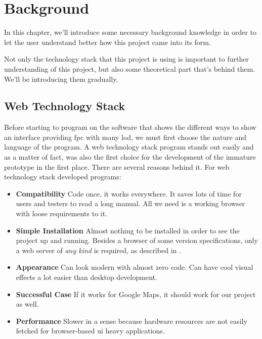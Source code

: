 
\chapter{Background} %

\label{Chapter2} %

In this chapter, we'll introduce some necessary background knowledge in order to let the user understand better how this project came into its form.

Not only the technology stack that this project is using is important to further understanding of this project, but also some theoretical part that's behind them. We'll be introducing them gradually.


\section{Web Technology Stack}

Before starting to program on the software that shows the different ways to show an interface providing \gls{fpc} with many \gls{lod}, we must first choose the nature and language of the program. A web technology stack program stands out easily and as a matter of fact, was also the first choice for the development of the immature prototype in the first place. There are several reasons behind it. For web technology stack developed programs:

\begin{itemize}
    \item \textbf{Compatibility} Code once, it works everywhere. It saves lots of time for users and testers to read a long manual. All we need is a working browser with loose requirements to it.
    \item \textbf{Simple Installation} Almost nothing to be installed in order to see the project up and running. Besides a browser of some version specifications, only a web server of \emph{any kind} is required, as described in .
    \item \textbf{Appearance} Can look modern with almost zero code. Can have cool visual effects a lot easier than desktop development. 
    \item \textbf{Successful Case} If it works for Google Maps, it should work for our project as well.
    \item \textbf{Performance} Slower in a sense because hardware resources are not easily fetched for browser-based \gls{ui} heavy applications.
\end{itemize}

